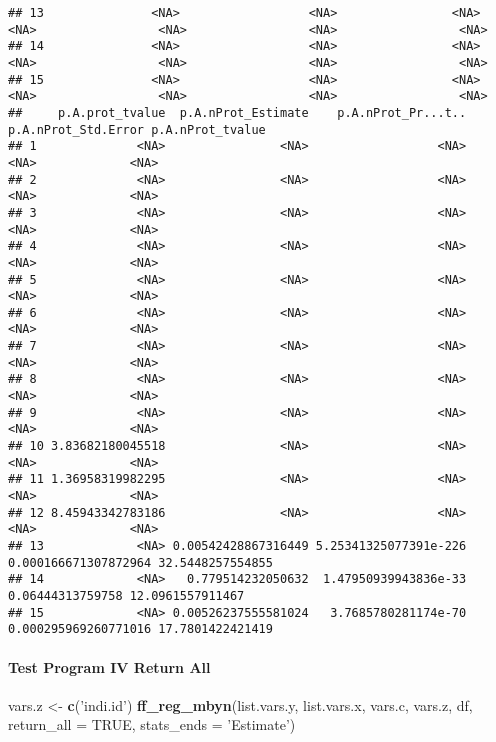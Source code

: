 \documentclass[
]{book}
\newenvironment{Shaded}{\begin{snugshade}}{\end{snugshade}}
\newcommand{\DataTypeTok}[1]{\textcolor[rgb]{0.13,0.29,0.53}{#1}}
\newcommand{\KeywordTok}[1]{\textcolor[rgb]{0.13,0.29,0.53}{\textbf{#1}}}
\newcommand{\NormalTok}[1]{#1}
\newcommand{\OtherTok}[1]{\textcolor[rgb]{0.56,0.35,0.01}{#1}}
\newcommand{\StringTok}[1]{\textcolor[rgb]{0.31,0.60,0.02}{#1}}
\begin{document}
\begin{verbatim}
## 13               <NA>                  <NA>                <NA>             <NA>                 <NA>                 <NA>                 <NA>
## 14               <NA>                  <NA>                <NA>             <NA>                 <NA>                 <NA>                 <NA>
## 15               <NA>                  <NA>                <NA>             <NA>                 <NA>                 <NA>                 <NA>
##     p.A.prot_tvalue  p.A.nProt_Estimate    p.A.nProt_Pr...t..  p.A.nProt_Std.Error p.A.nProt_tvalue
## 1              <NA>                <NA>                  <NA>                 <NA>             <NA>
## 2              <NA>                <NA>                  <NA>                 <NA>             <NA>
## 3              <NA>                <NA>                  <NA>                 <NA>             <NA>
## 4              <NA>                <NA>                  <NA>                 <NA>             <NA>
## 5              <NA>                <NA>                  <NA>                 <NA>             <NA>
## 6              <NA>                <NA>                  <NA>                 <NA>             <NA>
## 7              <NA>                <NA>                  <NA>                 <NA>             <NA>
## 8              <NA>                <NA>                  <NA>                 <NA>             <NA>
## 9              <NA>                <NA>                  <NA>                 <NA>             <NA>
## 10 3.83682180045518                <NA>                  <NA>                 <NA>             <NA>
## 11 1.36958319982295                <NA>                  <NA>                 <NA>             <NA>
## 12 8.45943342783186                <NA>                  <NA>                 <NA>             <NA>
## 13             <NA> 0.00542428867316449 5.25341325077391e-226 0.000166671307872964 32.5448257554855
## 14             <NA>   0.779514232050632  1.47950939943836e-33     0.06444313759758 12.0961557911467
## 15             <NA> 0.00526237555581024   3.7685780281174e-70 0.000295969260771016 17.7801422421419
\end{verbatim}

\hypertarget{test-program-iv-return-all}{%
\paragraph{Test Program IV Return All}\label{test-program-iv-return-all}}

\begin{Shaded}
\begin{Highlighting}[]
\NormalTok{vars.z <-}\StringTok{ }\KeywordTok{c}\NormalTok{(}\StringTok{'indi.id'}\NormalTok{)}
\KeywordTok{ff_reg_mbyn}\NormalTok{(list.vars.y, list.vars.x,}
\NormalTok{            vars.c, vars.z, df,}
            \DataTypeTok{return_all =} \OtherTok{TRUE}\NormalTok{,}
            \DataTypeTok{stats_ends =} \StringTok{'Estimate'}\NormalTok{)}
\end{Highlighting}
\end{Shaded}
\end{document}
